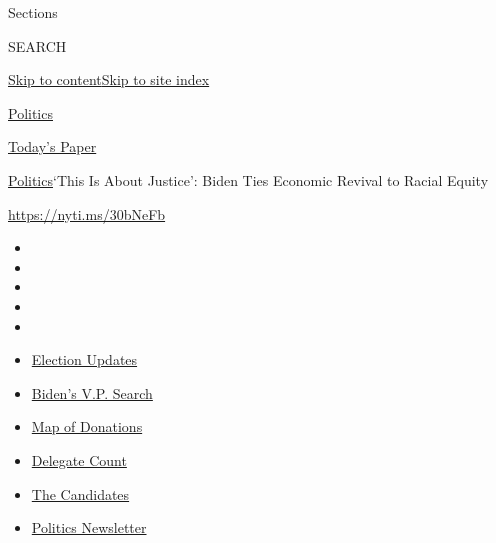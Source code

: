 Sections

SEARCH

\protect\hyperlink{site-content}{Skip to
content}\protect\hyperlink{site-index}{Skip to site index}

\href{https://www.nytimes.com/section/politics}{Politics}

\href{https://myaccount.nytimes.com/auth/login?response_type=cookie\&client_id=vi}{}

\href{https://www.nytimes.com/section/todayspaper}{Today's Paper}

\href{/section/politics}{Politics}\textbar{}`This Is About Justice':
Biden Ties Economic Revival to Racial Equity

\url{https://nyti.ms/30bNeFb}

\begin{itemize}
\item
\item
\item
\item
\item
\end{itemize}

\begin{itemize}
\item
  \href{https://www.nytimes.com/2020/07/31/us/elections/biden-vs-trump.html?action=click\&pgtype=Article\&state=default\&region=TOP_BANNER\&context=storylines_menu}{Election
  Updates}
\item
  \href{https://www.nytimes.com/article/biden-vice-president-2020.html?action=click\&pgtype=Article\&state=default\&region=TOP_BANNER\&context=storylines_menu}{Biden's
  V.P. Search}
\item
  \href{https://www.nytimes.com/interactive/2020/07/24/us/politics/trump-biden-campaign-donors.html?action=click\&pgtype=Article\&state=default\&region=TOP_BANNER\&context=storylines_menu}{Map
  of Donations}
\item
  \href{https://www.nytimes.com/interactive/2020/us/elections/delegate-count-primary-results.html?action=click\&pgtype=Article\&state=default\&region=TOP_BANNER\&context=storylines_menu}{Delegate
  Count}
\item
  \href{https://www.nytimes.com/interactive/2019/us/politics/2020-presidential-candidates.html?action=click\&pgtype=Article\&state=default\&region=TOP_BANNER\&context=storylines_menu}{The
  Candidates}
\item
  \href{https://www.nytimes.com/newsletters/politics?action=click\&pgtype=Article\&state=default\&region=TOP_BANNER\&context=storylines_menu}{Politics
  Newsletter}
\end{itemize}

